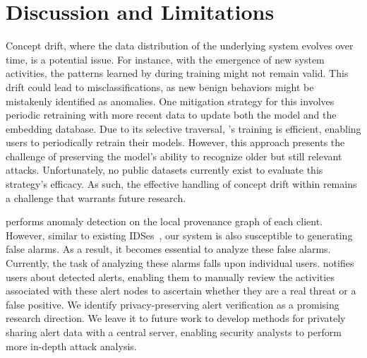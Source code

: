 \section{Discussion and Limitations}
\label{sec:discussion}




 Concept drift, where the data distribution of the underlying system evolves over time, is a potential issue. For instance, with the emergence of new system activities, the patterns learned by \Sys during training might not remain valid. This drift could lead to misclassifications, as new benign behaviors might be mistakenly identified as anomalies. One mitigation strategy for this involves periodic retraining with more recent data to update both the model and the embedding database. Due to its selective traversal, \Sys’s training is efficient, enabling users to periodically retrain their models. However, this approach presents the challenge of preserving the model’s ability to recognize older but still relevant attacks. Unfortunately, no public datasets currently exist to evaluate this strategy’s efficacy. As such, the effective handling of concept drift within \Sys remains a challenge that warrants future research.

 \Sys performs anomaly detection on the local provenance graph of each client. However, similar to existing IDSes~\cite{flash2024,cheng2023kairos,wang2022threatrace}, our system is also susceptible to generating false alarms. As a result, it becomes essential to analyze these false alarms. Currently, the task of analyzing these alarms falls upon individual users. \Sys notifies users about detected alerts, enabling them to manually review the activities associated with these alert nodes to ascertain whether they are a real threat or a false positive. We identify privacy-preserving alert verification as a promising research direction. We leave it to future work to develop methods for privately sharing alert data with a central server, enabling security analysts to perform more in-depth attack analysis.


